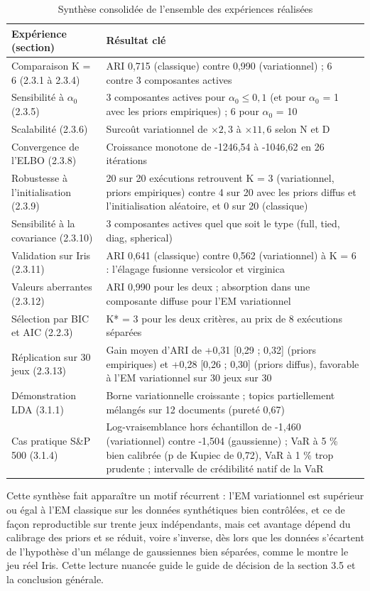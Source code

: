 \begin{table}[H]
\centering
\small
\setlength{\tabcolsep}{0.14cm}
\begin{tabular}{|p{5.2cm}|p{9.6cm}|}
\hline
\textbf{Expérience (section)} & \textbf{Résultat clé} \\
\hline
Comparaison K = 6 (2.3.1 à 2.3.4) & ARI 0,715 (classique) contre 0,990 (variationnel) ; 6 contre 3 composantes actives \\
\hline
Sensibilité à $\alpha _{0}$ (2.3.5) & 3 composantes actives pour $\alpha _{0} \leq 0,1$ (et pour $\alpha _{0}$ = 1 avec les priors empiriques) ; 6 pour $\alpha _{0}$ = 10 \\
\hline
Scalabilité (2.3.6) & Surcoût variationnel de $\times 2,3$ à $\times 11,6$ selon N et D \\
\hline
Convergence de l'ELBO (2.3.8) & Croissance monotone de -1246,54 à -1046,62 en 26 itérations \\
\hline
Robustesse à l'initialisation (2.3.9) & 20 sur 20 exécutions retrouvent K = 3 (variationnel, priors empiriques) contre 4 sur 20 avec les priors diffus et l'initialisation aléatoire, et 0 sur 20 (classique) \\
\hline
Sensibilité à la covariance (2.3.10) & 3 composantes actives quel que soit le type (full, tied, diag, spherical) \\
\hline
Validation sur Iris (2.3.11) & ARI 0,641 (classique) contre 0,562 (variationnel) à K = 6 : l'élagage fusionne versicolor et virginica \\
\hline
Valeurs aberrantes (2.3.12) & ARI 0,990 pour les deux ; absorption dans une composante diffuse pour l'EM variationnel \\
\hline
Sélection par BIC et AIC (2.2.3) & K* = 3 pour les deux critères, au prix de 8 exécutions séparées \\
\hline
Réplication sur 30 jeux (2.3.13) & Gain moyen d'ARI de +0,31 [0,29 ; 0,32] (priors empiriques) et +0,28 [0,26 ; 0,30] (priors diffus), favorable à l'EM variationnel sur 30 jeux sur 30 \\
\hline
Démonstration LDA (3.1.1) & Borne variationnelle croissante ; topics partiellement mélangés sur 12 documents (pureté 0,67) \\
\hline
Cas pratique S\&P 500 (3.1.4) & Log-vraisemblance hors échantillon de -1,460 (variationnel) contre -1,504 (gaussienne) ; VaR à 5 \% bien calibrée (p de Kupiec de 0,72), VaR à 1 \% trop prudente ; intervalle de crédibilité natif de la VaR \\
\hline
\end{tabular}
\caption{Synthèse consolidée de l'ensemble des expériences réalisées}
\label{tab:3_3}
\end{table}
Cette synthèse fait apparaître un motif récurrent : l'EM variationnel est supérieur ou égal à l'EM classique sur les données synthétiques bien contrôlées, et ce de façon reproductible sur trente jeux indépendants, mais cet avantage dépend du calibrage des priors et se réduit, voire s'inverse, dès lors que les données s'écartent de l'hypothèse d'un mélange de gaussiennes bien séparées, comme le montre le jeu réel Iris. Cette lecture nuancée guide le guide de décision de la section 3.5 et la conclusion générale.

